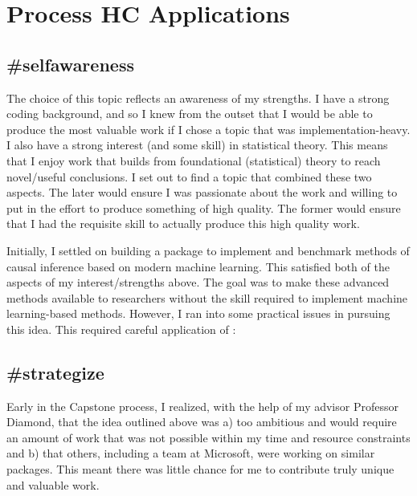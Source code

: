 \documentclass[./main.tex]{subfiles}
\begin{document}

\section{Process HC Applications}
\label{hc:section-process}

\subsection*{\textbf{\#selfawareness}}
\label{hc:selfawareness}

The choice of this topic reflects an awareness of my strengths. I have a strong coding background, and so I knew from the outset that I would be able to produce the most valuable work if I chose a topic that was implementation-heavy. I also have a strong interest (and some skill) in statistical theory. This means that I enjoy work that builds from foundational (statistical) theory to reach novel/useful conclusions. I set out to find a topic that combined these two aspects. The later would ensure I was passionate about the work and willing to put in the effort to produce something of high quality. The former would ensure that I had the requisite skill to actually produce this high quality work.

\vspace{\baselineskip}

Initially, I settled on building a package to implement and benchmark methods of causal inference based on modern machine learning. This satisfied both of the aspects of my interest/strengths above. The goal was to make these advanced methods available to researchers without the skill required to implement machine learning-based methods. However, I ran into some practical issues in pursuing this idea. This required careful application of :


\subsection*{\textbf{\#strategize}}
\label{hc:strategize}

Early in the Capstone process, I realized, with the help of my advisor Professor Diamond, that the idea outlined above was a) too ambitious and would require an amount of work that was not possible within my time and resource constraints and b) that others, including a team at Microsoft, were working on similar packages. This meant there was little chance for me to contribute truly unique and valuable work.
\end{document}
